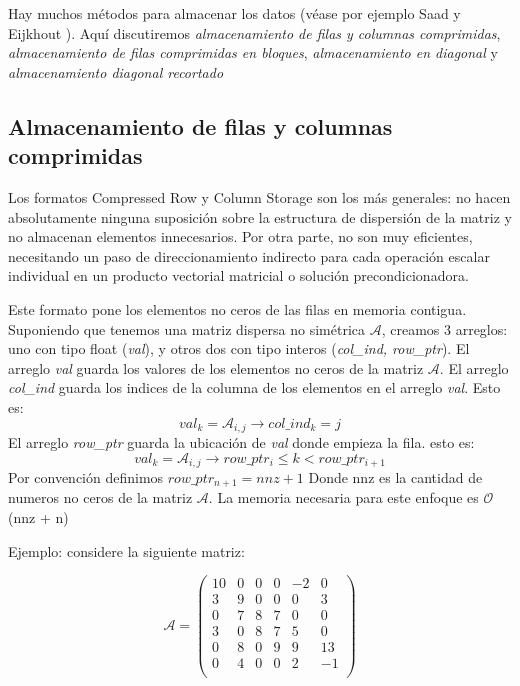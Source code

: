 \documentclass[a4paper,openright,12pt, oneside]{book}
\DeclareRobustCommand{\orderof}{\ensuremath{\mathcal{O}}}
\newcommand{\implica}{\rightarrow}
\begin{document}
Hay muchos m\'etodos para almacenar los datos (v\'ease por ejemplo Saad \cite{SPARSKIT} y Eijkhout \cite{LAPACK}). Aqu\'i discutiremos \textit{almacenamiento de filas y columnas comprimidas}, \textit{almacenamiento de filas comprimidas en bloques}, \textit{almacenamiento en diagonal} y \textit{almacenamiento diagonal recortado}

\subsection{Almacenamiento de filas y columnas comprimidas}

Los formatos Compressed Row y Column Storage son los m\'as generales: no hacen absolutamente ninguna suposici\'on sobre la estructura de dispersi\'on de la matriz y no almacenan elementos innecesarios. Por otra parte, no son muy eficientes, necesitando un paso de direccionamiento indirecto para cada operaci\'on escalar individual en un producto vectorial matricial o soluci\'on precondicionadora.

Este formato pone los elementos no ceros de las filas en memoria contigua. Suponiendo que tenemos una matriz dispersa no sim\'etrica $\mathcal{A}$, creamos 3 arreglos: uno con tipo float (\textit{val}), y otros dos con tipo interos (\textit{col\_ind, row\_ptr}). El arreglo \textit{val} guarda los valores de los elementos no ceros de la matriz $\mathcal{A}$. El arreglo \textit{col\_ind} guarda los indices de la columna de los elementos en el arreglo \textit{val}. Esto es: 
$$val_{k} = \mathcal{A}_{i,j} \implica col\_ind_{k} = j $$
El arreglo \textit{row\_ptr} guarda la ubicaci\'on de \textit{val} donde empieza la fila. esto es:
$$val_{k} = \mathcal{A}_{i,j} \implica row\_ptr_{i} \leq k < row\_ptr_{i+1} $$
Por convenci\'on definimos $row\_ptr_{n+1} = nnz + 1$ Donde nnz es la cantidad de numeros no ceros de la matriz $\mathcal{A}$. La memoria necesaria para este enfoque es \orderof(nnz + n)

Ejemplo: considere la siguiente matriz:

\begin{equation}
\mathcal{A} =
\left(
\begin{array}{cccccc}
 
10& 0& 0& 0& -2& 0 \\

3& 9& 0& 0& 0& 3 \\
   
0& 7& 8& 7& 0& 0 \\

3& 0& 8& 7& 5& 0 \\
   
0& 8& 0& 9& 9& 13 \\
    
0& 4& 0& 0& 2& -1 \\
\end{array}
\right)
\end{equation}
\end{document}
